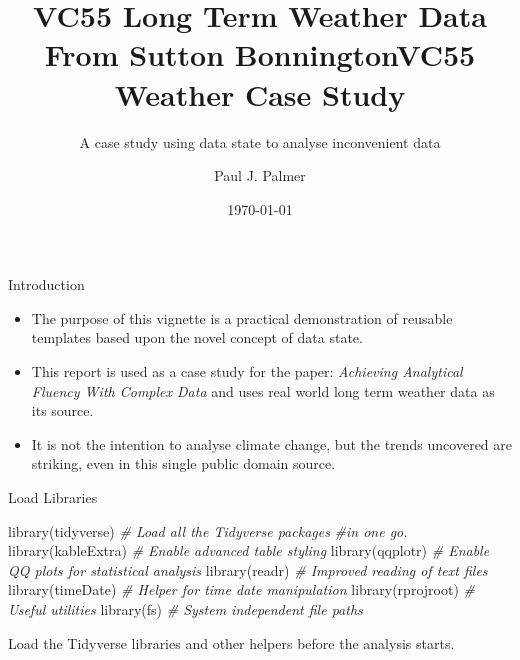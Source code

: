 \documentclass[
  ignorenonframetext,
]{beamer}
\title[ VC55 Weather Case Study]{VC55 Long Term Weather Data From Sutton Bonnington} %
\subtitle{A case study using data state to analyse inconvenient data}
\institute[LU] %
{
    Visiting Fellow \\
    Loughborough University \\
    \copyright~P.J.~Palmer~2022
    
    
    
}
\author{}
\date{\vspace{-2.5em}\today} %
\title{VC55 Weather Case Study}
\author{Paul J. Palmer}
\date{}
\newenvironment{Shaded}{\begin{snugshade}}{\end{snugshade}}
\newcommand{\CommentTok}[1]{\textcolor[rgb]{0.56,0.35,0.01}{\textit{#1}}}
\newcommand{\FunctionTok}[1]{\textcolor[rgb]{0.00,0.00,0.00}{#1}}
\newcommand{\NormalTok}[1]{#1}
\providecommand{\tightlist}{%
  \setlength{\itemsep}{0pt}\setlength{\parskip}{0pt}}
\begin{document}
\frame{\titlepage}

\begin{frame}{Introduction}
\protect\hypertarget{introduction}{}
\begin{itemize}
\tightlist
\item
  The purpose of this vignette is a practical demonstration of reusable
  templates based upon the novel concept of data state.
\item
  This report is used as a case study for the paper: \emph{Achieving
  Analytical Fluency With Complex Data} and uses real world long term
  weather data as its source.
\item
  It is not the intention to analyse climate change, but the trends
  uncovered are striking, even in this single public domain source.
\end{itemize}
\end{frame}

\begin{frame}[fragile]{Load Libraries}
\protect\hypertarget{load-libraries}{}
\begin{Shaded}
\begin{Highlighting}[]
\FunctionTok{library}\NormalTok{(tidyverse) }\CommentTok{\# Load all the Tidyverse packages }
\CommentTok{\#in one go.}
\FunctionTok{library}\NormalTok{(kableExtra) }\CommentTok{\# Enable advanced table styling}
\FunctionTok{library}\NormalTok{(qqplotr) }\CommentTok{\# Enable QQ plots for statistical analysis}
\FunctionTok{library}\NormalTok{(readr) }\CommentTok{\# Improved reading of text files}
\FunctionTok{library}\NormalTok{(timeDate) }\CommentTok{\# Helper for time date manipulation}
\FunctionTok{library}\NormalTok{(rprojroot) }\CommentTok{\# Useful utilities}
\FunctionTok{library}\NormalTok{(fs) }\CommentTok{\# System independent file paths}
\end{Highlighting}
\end{Shaded}

Load the Tidyverse libraries and other helpers before the analysis
starts.
\end{frame}
\end{document}
